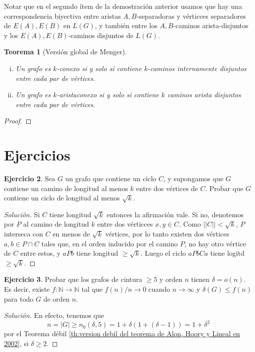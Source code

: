 \documentclass[12pt]{report}
\theoremstyle{plain}
\newtheorem{theorem}{Teorema}[section]
\theoremstyle{definition}
\newtheorem{exercise}[theorem]{Ejercicio}
\newenvironment{solution}{\begin{proof}[Solución]}{\end{proof}}
\newcommand{\naturals}{\mathbb{N}}
\newcommand{\abs}[1]{\left \vert #1 \right \vert}
\newcommand{\Abs}[1]{\left \vert \left \vert #1 \right \vert \right \vert}
\begin{document}
Notar que en el segundo ítem de la demostración anterior usamos que hay una correspondencia biyectiva entre aristas $A,B$-separadoras y vérticces separadores de $E(A),E(B)$ en $L(G)$, y también entre los $A,B$-caminos arista-disjuntos y los $E(A),E(B)$-caminos disjuntos de $L(G)$.

\begin{theorem}[Versión global de Menger]\label{th:version global de Menger}
\begin{enumerate}[(i)]
\item Un grafo es $k$-conexo si y solo si contiene $k$-caminos internamente disjuntos entre cada par de vértices.
\item Un grafo es $k$-aristaconexo si y solo si contiene $k$ caminos arista disjuntos entre cada par de vértices.
\end{enumerate}
\end{theorem}
\begin{proof}

\end{proof}





\section{Ejercicios}

\begin{exercise}
Sea $G$ un grafo que contiene un ciclo $C$, y supongamos que $G$ contiene un camino de longitud al menos $k$ entre
dos vértices de $C$. Probar que $G$ contiene un ciclo de longitud al menos $\sqrt k$.
\end{exercise}
\begin{solution}
Si $C$ tiene longitud $\sqrt k$ entonces la afirmación vale. Si no, denotemos por $P$ al camino de longitud $k$
entre dos vérticces $x,y \in C$. Como $\Abs C < \sqrt k$, $P$ interseca con $C$ en menos de $\sqrt k$ vértices,
por lo tanto existen dos vértices $a,b \in P \cap C$ tales que, en el orden inducido por el camino $P$, no hay otro
vértice de $C$ entre estos, y $a P b$ tiene longitud $\geq \sqrt k$. Luego el ciclo $a P b C a$ tiene logitd $\geq \sqrt k$.
\end{solution}


\begin{exercise}
Probar que los grafos de cintura $\geq 5$ y orden $n$ tienen $\delta = o (n)$. Es decir, existe $f : \naturals \rightarrow \naturals$ tal que $f(n) /n \rightarrow 0$ cuando $n \rightarrow \infty$ y $\delta (G) \leq f(n)$ para todo $G$ de orden $n$.
\end{exercise}
\begin{solution}
En efecto, tenemos que
$$
n = \abs G \geq n_0 ( \delta, 5) = 1 + \delta (1 + (\delta -1)) = 1 + \delta^2
$$
por el Teorema débil \ref{th:version debil del teorema de Alon, Hoory y Lineal en 2002}, si $\delta \geq 2$.
\end{solution}
\end{document}
